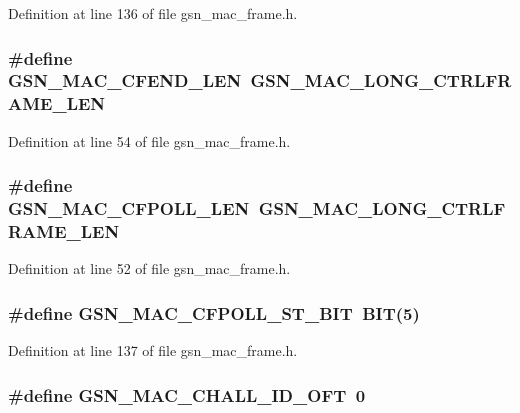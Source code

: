 Definition at line 136 of file gsn\_\-mac\_\-frame.h.

\hypertarget{a00523_a6d115297bc911bba891f99e2a3ea7db4}{
\subsubsection[{GSN\_\-MAC\_\-CFEND\_\-LEN}]{\setlength{\rightskip}{0pt plus 5cm}\#define GSN\_\-MAC\_\-CFEND\_\-LEN~GSN\_\-MAC\_\-LONG\_\-CTRLFRAME\_\-LEN}}
\label{a00523_a6d115297bc911bba891f99e2a3ea7db4}


Definition at line 54 of file gsn\_\-mac\_\-frame.h.

\hypertarget{a00523_ab902a1d8f0597a19b93793172f704d21}{
\subsubsection[{GSN\_\-MAC\_\-CFPOLL\_\-LEN}]{\setlength{\rightskip}{0pt plus 5cm}\#define GSN\_\-MAC\_\-CFPOLL\_\-LEN~GSN\_\-MAC\_\-LONG\_\-CTRLFRAME\_\-LEN}}
\label{a00523_ab902a1d8f0597a19b93793172f704d21}


Definition at line 52 of file gsn\_\-mac\_\-frame.h.

\hypertarget{a00523_af8bfdb80251044fe896147ff5f8d9e66}{
\subsubsection[{GSN\_\-MAC\_\-CFPOLL\_\-ST\_\-BIT}]{\setlength{\rightskip}{0pt plus 5cm}\#define GSN\_\-MAC\_\-CFPOLL\_\-ST\_\-BIT~BIT(5)}}
\label{a00523_af8bfdb80251044fe896147ff5f8d9e66}


Definition at line 137 of file gsn\_\-mac\_\-frame.h.

\hypertarget{a00523_a7bc202a12f40ac60a360325b457480ec}{
\subsubsection[{GSN\_\-MAC\_\-CHALL\_\-ID\_\-OFT}]{\setlength{\rightskip}{0pt plus 5cm}\#define GSN\_\-MAC\_\-CHALL\_\-ID\_\-OFT~0}}
\label{a00523_a7bc202a12f40ac60a360325b457480ec}


